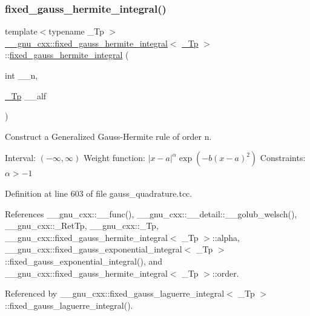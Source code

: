 \subsubsection{\texorpdfstring{fixed\+\_\+gauss\+\_\+hermite\+\_\+integral()}{fixed\_gauss\_hermite\_integral()}}
{\footnotesize\ttfamily template$<$typename \+\_\+\+Tp $>$ \\
\hyperlink{struct____gnu__cxx_1_1fixed__gauss__hermite__integral}{\+\_\+\+\_\+gnu\+\_\+cxx\+::fixed\+\_\+gauss\+\_\+hermite\+\_\+integral}$<$ \hyperlink{namespace____gnu__cxx_a3b19a9c800ca194374ef9172290f7d79}{\+\_\+\+Tp} $>$\+::\hyperlink{struct____gnu__cxx_1_1fixed__gauss__hermite__integral}{fixed\+\_\+gauss\+\_\+hermite\+\_\+integral} (\begin{DoxyParamCaption}\item[{int}]{\+\_\+\+\_\+n,  }\item[{\hyperlink{namespace____gnu__cxx_a3b19a9c800ca194374ef9172290f7d79}{\+\_\+\+Tp}}]{\+\_\+\+\_\+alf }\end{DoxyParamCaption})\hspace{0.3cm}{\ttfamily [explicit]}}

Construct a Generalized Gauss-\/\+Hermite rule of order {\ttfamily n}.

Interval\+: $ (-\infty, \infty) $ Weight function\+: $ |x-a|^\alpha \exp(-b(x-a)^2) $ Constraints\+: $ \alpha > -1 $ 

Definition at line 603 of file gauss\+\_\+quadrature.\+tcc.



References \+\_\+\+\_\+gnu\+\_\+cxx\+::\+\_\+\+\_\+func(), \+\_\+\+\_\+gnu\+\_\+cxx\+::\+\_\+\+\_\+detail\+::\+\_\+\+\_\+golub\+\_\+welsch(), \+\_\+\+\_\+gnu\+\_\+cxx\+::\+\_\+\+Ret\+Tp, \+\_\+\+\_\+gnu\+\_\+cxx\+::\+\_\+\+Tp, \+\_\+\+\_\+gnu\+\_\+cxx\+::fixed\+\_\+gauss\+\_\+hermite\+\_\+integral$<$ \+\_\+\+Tp $>$\+::alpha, \+\_\+\+\_\+gnu\+\_\+cxx\+::fixed\+\_\+gauss\+\_\+exponential\+\_\+integral$<$ \+\_\+\+Tp $>$\+::fixed\+\_\+gauss\+\_\+exponential\+\_\+integral(), and \+\_\+\+\_\+gnu\+\_\+cxx\+::fixed\+\_\+gauss\+\_\+hermite\+\_\+integral$<$ \+\_\+\+Tp $>$\+::order.



Referenced by \+\_\+\+\_\+gnu\+\_\+cxx\+::fixed\+\_\+gauss\+\_\+laguerre\+\_\+integral$<$ \+\_\+\+Tp $>$\+::fixed\+\_\+gauss\+\_\+laguerre\+\_\+integral().


